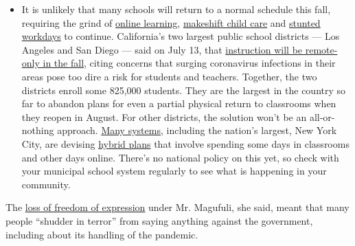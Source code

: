 \begin{itemize}
  \begin{itemize}
  \tightlist
  \item
    It is unlikely that many schools will return to a normal schedule
    this fall, requiring the grind of
    \href{https://www.nytimes3xbfgragh.onion/2020/06/05/us/coronavirus-education-lost-learning.html?action=click\&pgtype=Article\&state=default\&region=MAIN_CONTENT_3\&context=storylines_faq}{online
    learning},
    \href{https://www.nytimes3xbfgragh.onion/2020/05/29/us/coronavirus-child-care-centers.html?action=click\&pgtype=Article\&state=default\&region=MAIN_CONTENT_3\&context=storylines_faq}{makeshift
    child care} and
    \href{https://www.nytimes3xbfgragh.onion/2020/06/03/business/economy/coronavirus-working-women.html?action=click\&pgtype=Article\&state=default\&region=MAIN_CONTENT_3\&context=storylines_faq}{stunted
    workdays} to continue. California's two largest public school
    districts --- Los Angeles and San Diego --- said on July 13, that
    \href{https://www.nytimes3xbfgragh.onion/2020/07/13/us/lausd-san-diego-school-reopening.html?action=click\&pgtype=Article\&state=default\&region=MAIN_CONTENT_3\&context=storylines_faq}{instruction
    will be remote-only in the fall}, citing concerns that surging
    coronavirus infections in their areas pose too dire a risk for
    students and teachers. Together, the two districts enroll some
    825,000 students. They are the largest in the country so far to
    abandon plans for even a partial physical return to classrooms when
    they reopen in August. For other districts, the solution won't be an
    all-or-nothing approach.
    \href{https://bioethics.jhu.edu/research-and-outreach/projects/eschool-initiative/school-policy-tracker/}{Many
    systems}, including the nation's largest, New York City, are
    devising
    \href{https://www.nytimes3xbfgragh.onion/2020/06/26/us/coronavirus-schools-reopen-fall.html?action=click\&pgtype=Article\&state=default\&region=MAIN_CONTENT_3\&context=storylines_faq}{hybrid
    plans} that involve spending some days in classrooms and other days
    online. There's no national policy on this yet, so check with your
    municipal school system regularly to see what is happening in your
    community.
  \end{itemize}
\end{itemize}

The
\href{https://www.article19.org/reader/global-expression-report-2018-19/regional-overviews/africa-regional-overview/africa-countries-in-focus/country-in-focus-tanzania/\#_ftnref2}{loss
of freedom of expression} under Mr. Magufuli, she said, meant that many
people ``shudder in terror'' from saying anything against the
government, including about its handling of the pandemic.

